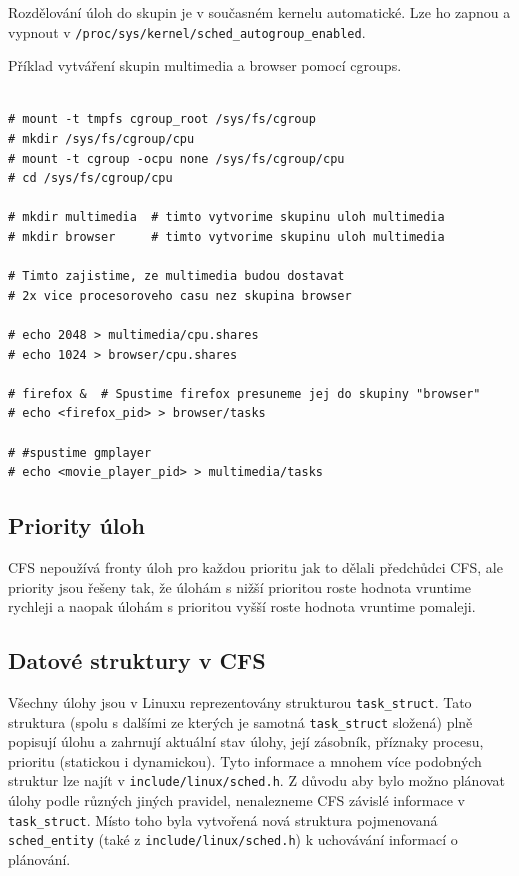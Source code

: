 \documentclass[a4paper,12pt]{article}
\begin{document}
Rozdělování úloh do skupin je v současném kernelu automatické. Lze ho zapnou a vypnout v \verb#/proc/sys/kernel/sched_autogroup_enabled#.

Příklad vytváření skupin multimedia a browser pomocí cgroups.

\begin{verbatim} 

# mount -t tmpfs cgroup_root /sys/fs/cgroup
# mkdir /sys/fs/cgroup/cpu
# mount -t cgroup -ocpu none /sys/fs/cgroup/cpu
# cd /sys/fs/cgroup/cpu

# mkdir multimedia  # timto vytvorime skupinu uloh multimedia 
# mkdir browser     # timto vytvorime skupinu uloh multimedia 

# Timto zajistime, ze multimedia budou dostavat 
# 2x vice procesoroveho casu nez skupina browser

# echo 2048 > multimedia/cpu.shares
# echo 1024 > browser/cpu.shares

# firefox &  # Spustime firefox presuneme jej do skupiny "browser"
# echo <firefox_pid> > browser/tasks

# #spustime gmplayer
# echo <movie_player_pid> > multimedia/tasks

\end{verbatim} 

\subsection{Priority úloh}

CFS nepoužívá fronty úloh pro každou prioritu jak to dělali předchůdci CFS, ale priority jsou řešeny tak, že úlohám s nižší prioritou roste hodnota vruntime rychleji a naopak úlohám s prioritou vyšší roste hodnota vruntime pomaleji.

\subsection{Datové struktury v CFS}

Všechny úlohy jsou v Linuxu reprezentovány strukturou \verb#task_struct#. Tato struktura (spolu s dalšími ze kterých je samotná \verb#task_struct# složená) plně popisují úlohu a zahrnují aktuální stav úlohy, její zásobník, příznaky procesu, prioritu (statickou i dynamickou). Tyto informace a mnohem více podobných struktur lze najít v \verb#include/linux/sched.h#. Z důvodu aby bylo možno plánovat úlohy podle různých jiných pravidel, nenalezneme CFS závislé informace v \verb#task_struct#. Místo toho byla vytvořená nová struktura pojmenovaná \verb#sched_entity# (také z \verb#include/linux/sched.h#) k uchovávání informací o plánování.
\end{document}
